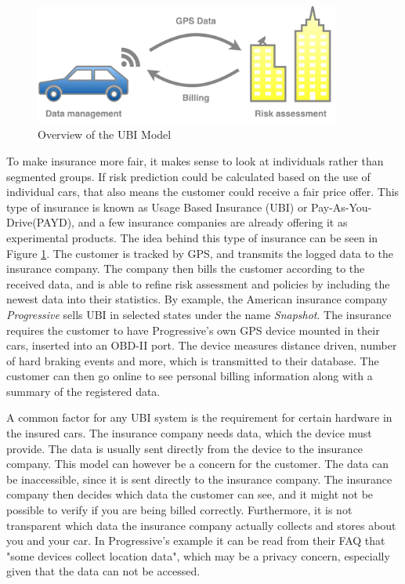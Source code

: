 \begin{figure}[tb]
\centering
\includegraphics[width=0.9\textwidth]{Pictures/Overview}
\caption{Overview of the UBI Model}
\label{fig:overview}
\end{figure}

To make insurance more fair, it makes sense to look at individuals rather than segmented groups. If risk prediction could be calculated based on the use of individual cars, that also means the customer could receive a fair price offer. This type of insurance is known as Usage Based Insurance (UBI) or Pay-As-You-Drive(PAYD), and a few insurance companies are already offering it as experimental products. The idea behind this type of insurance can be seen in Figure \ref{fig:overview}. The customer is tracked by GPS, and transmits the logged data to the insurance company. The company then bills the customer according to the received data, and is able to refine risk assessment and policies by including the newest data into their statistics.
By example, the American insurance company \textit{Progressive} sells UBI in selected states under the name \textit{Snapshot}\cite{snapshot}. The insurance requires the customer to have Progressive's own GPS device mounted in their cars, inserted into an OBD-II port. The device measures distance driven, number of hard braking events and more, which is transmitted to their database. The customer can then go online to see personal billing information along with a summary of the registered data.

A common factor for any UBI system is the requirement for certain hardware in the insured cars. The insurance company needs data, which the device must provide. The data is usually sent directly from the device to the insurance company. This model can however be a concern for the customer. The data can be inaccessible, since it is sent directly to the insurance company. The insurance company then decides which data the customer can see, and it might not be possible to verify if you are being billed correctly. Furthermore, it is not transparent which data the insurance company actually collects and stores about you and your car. In Progressive's example it can be read from their FAQ that "some devices collect location data", which may be a privacy concern, especially given that the data can not be accessed.

